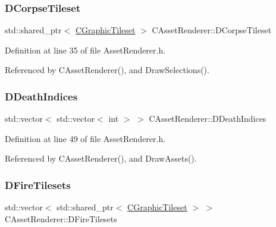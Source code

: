 \subsubsection{\texorpdfstring{D\+Corpse\+Tileset}{DCorpseTileset}}
{\footnotesize\ttfamily std\+::shared\+\_\+ptr$<$ \hyperlink{classCGraphicTileset}{C\+Graphic\+Tileset} $>$ C\+Asset\+Renderer\+::\+D\+Corpse\+Tileset\hspace{0.3cm}{\ttfamily [protected]}}



Definition at line 35 of file Asset\+Renderer.\+h.



Referenced by C\+Asset\+Renderer(), and Draw\+Selections().

\hypertarget{classCAssetRenderer_a31be8b0e563072ee1168ab11154d15c8}{}\label{classCAssetRenderer_a31be8b0e563072ee1168ab11154d15c8} 
\subsubsection{\texorpdfstring{D\+Death\+Indices}{DDeathIndices}}
{\footnotesize\ttfamily std\+::vector$<$ std\+::vector$<$ int $>$ $>$ C\+Asset\+Renderer\+::\+D\+Death\+Indices\hspace{0.3cm}{\ttfamily [protected]}}



Definition at line 49 of file Asset\+Renderer.\+h.



Referenced by C\+Asset\+Renderer(), and Draw\+Assets().

\hypertarget{classCAssetRenderer_a7598d4658acf64e85ddd6daeca88c8e6}{}\label{classCAssetRenderer_a7598d4658acf64e85ddd6daeca88c8e6} 
\subsubsection{\texorpdfstring{D\+Fire\+Tilesets}{DFireTilesets}}
{\footnotesize\ttfamily std\+::vector$<$ std\+::shared\+\_\+ptr$<$ \hyperlink{classCGraphicTileset}{C\+Graphic\+Tileset} $>$ $>$ C\+Asset\+Renderer\+::\+D\+Fire\+Tilesets\hspace{0.3cm}{\ttfamily [protected]}}



